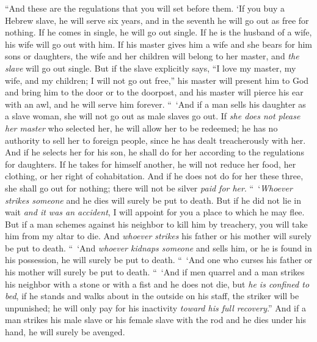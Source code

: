 \begin{biblechapter} %
 “And these are the regulations that you will set before them.
\verse ‘If you buy a Hebrew slave, he will serve six years, and in the seventh he will go out as free for nothing.
\verse If he comes in single, he will go out single. If he is the husband of a wife, his wife will go out with him.
\verse If his master gives him a wife and she bears for him sons or daughters, the wife and her children will belong to her master, and \textit{the slave} will go out single.
\verse But if the slave explicitly says, “I love my master, my wife, and my children; I will not go out free,”
\verse his master will present him to God and bring him to the door or to the doorpost, and his master will pierce his ear with an awl, and he will serve him forever.
\verse “ ‘And if a man sells his daughter as a slave woman, she will not go out as male slaves go out.
\verse If \textit{she does not please her master} who selected her, he will allow her to be redeemed; he has no authority to sell her to foreign people, since he has dealt treacherously with her.
\verse And if he selects her for his son, he shall do for her according to the regulations for daughters.
\verse If he takes for himself another, he will not reduce her food, her clothing, or her right of cohabitation.
\verse And if he does not do for her these three, she shall go out for nothing; there will not be silver \textit{paid for her}.
 “ ‘\textit{Whoever strikes someone} and he dies will surely be put to death.
\verse But if he did not lie in wait \textit{and it was an accident}, I will appoint for you a place to which he may flee.
\verse But if a man schemes against his neighbor to kill him by treachery, you will take him from my altar to die.
\verse And \textit{whoever strikes} his father or his mother will surely be put to death.
\verse “ ‘And \textit{whoever kidnaps someone} and sells him, or he is found in his possession, he will surely be put to death.
\verse “ ‘And one who curses his father or his mother will surely be put to death.
\verse “ ‘And if men quarrel and a man strikes his neighbor with a stone or with a fist and he does not die, but \textit{he is confined to bed},
\verse if he stands and walks about in the outside on his staff, the striker will be unpunished; he will only pay for his inactivity \textit{toward his full recovery}.”
\verse And if a man strikes his male slave or his female slave with the rod and he dies under his hand, he will surely be avenged.

\end{biblechapter}
